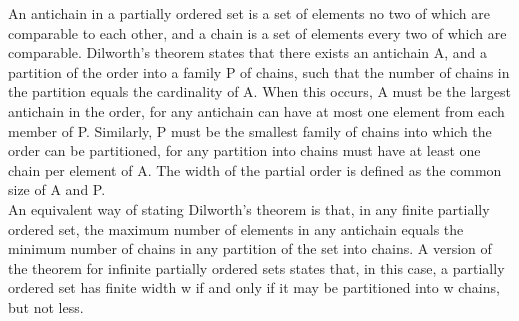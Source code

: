 An antichain in a partially ordered set is a set 
of elements no two of which are comparable to each 
other, and a chain is a set of elements every two 
of which are comparable. Dilworth's theorem states 
that there exists an antichain A, and a partition 
of the order into a family P of chains, such that 
the number of chains in the partition equals the 
cardinality of A. When this occurs, A must be the 
largest antichain in the order, for any antichain 
can have at most one element from each member of 
P. Similarly, P must be the smallest family of 
chains into which the order can be partitioned, 
for any partition into chains must have at least 
one chain per element of A. The width of the 
partial order is defined as the common size of A and P. \\

An equivalent way of stating Dilworth's theorem is that, 
in any finite partially ordered set, the maximum number 
of elements in any antichain equals the minimum number 
of chains in any partition of the set into chains. A 
version of the theorem for infinite partially ordered 
sets states that, in this case, a partially ordered 
set has finite width w if and only if it may be 
partitioned into w chains, but not less.